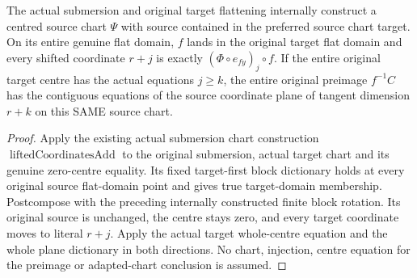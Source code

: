 \begin{theorem}
\label{hir:submersion-adapted-whole-original-centre}
\leanok
{}

The actual submersion and original target flattening internally construct a centred source chart $\Psi$ with source contained in the preferred source chart target. On its entire genuine flat domain, $f$ lands in the original target flat domain and every shifted coordinate $r+j$ is exactly $(\Phi\circ e_{fy})_j\circ f$. If the entire original target centre has the actual equations $j\geq k$, the entire original preimage $f^{-1}C$ has the contiguous equations of the source coordinate plane of tangent dimension $r+k$ on this SAME source chart.
\end{theorem}
\begin{proof}
Apply the existing actual submersion chart construction $\operatorname{liftedCoordinatesAdd}$ to the original submersion, actual target chart and its genuine zero-centre equality. Its fixed target-first block dictionary holds at every original source flat-domain point and gives true target-domain membership. Postcompose with the preceding internally constructed finite block rotation. Its original source is unchanged, the centre stays zero, and every target coordinate moves to literal $r+j$. Apply the actual target whole-centre equation and the whole plane dictionary in both directions. No chart, injection, centre equation for the preimage or adapted-chart conclusion is assumed.
\end{proof}

